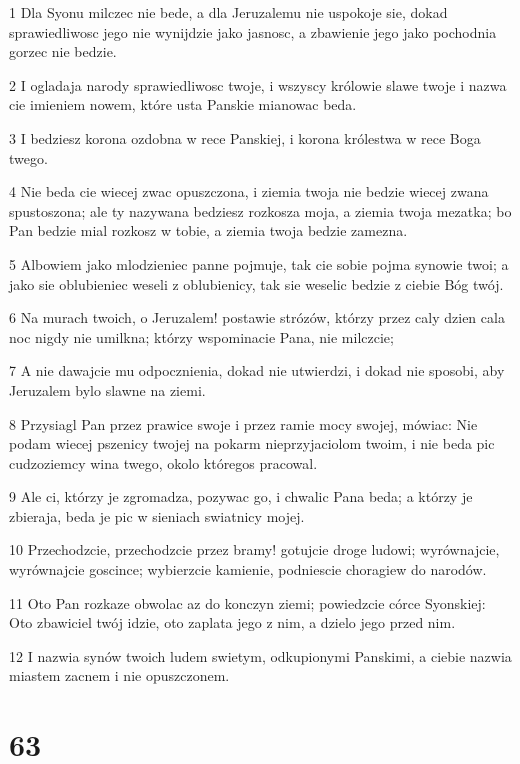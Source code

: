 \par 1 Dla Syonu milczec nie bede, a dla Jeruzalemu nie uspokoje sie, dokad sprawiedliwosc jego nie wynijdzie jako jasnosc, a zbawienie jego jako pochodnia gorzec nie bedzie.
\par 2 I ogladaja narody sprawiedliwosc twoje, i wszyscy królowie slawe twoje i nazwa cie imieniem nowem, które usta Panskie mianowac beda.
\par 3 I bedziesz korona ozdobna w rece Panskiej, i korona królestwa w rece Boga twego.
\par 4 Nie beda cie wiecej zwac opuszczona, i ziemia twoja nie bedzie wiecej zwana spustoszona; ale ty nazywana bedziesz rozkosza moja, a ziemia twoja mezatka; bo Pan bedzie mial rozkosz w tobie, a ziemia twoja bedzie zamezna.
\par 5 Albowiem jako mlodzieniec panne pojmuje, tak cie sobie pojma synowie twoi; a jako sie oblubieniec weseli z oblubienicy, tak sie weselic bedzie z ciebie Bóg twój.
\par 6 Na murach twoich, o Jeruzalem! postawie strózów, którzy przez caly dzien cala noc nigdy nie umilkna; którzy wspominacie Pana, nie milczcie;
\par 7 A nie dawajcie mu odpocznienia, dokad nie utwierdzi, i dokad nie sposobi, aby Jeruzalem bylo slawne na ziemi.
\par 8 Przysiagl Pan przez prawice swoje i przez ramie mocy swojej, mówiac: Nie podam wiecej pszenicy twojej na pokarm nieprzyjaciolom twoim, i nie beda pic cudzoziemcy wina twego, okolo któregos pracowal.
\par 9 Ale ci, którzy je zgromadza, pozywac go, i chwalic Pana beda; a którzy je zbieraja, beda je pic w sieniach swiatnicy mojej.
\par 10 Przechodzcie, przechodzcie przez bramy! gotujcie droge ludowi; wyrównajcie, wyrównajcie goscince; wybierzcie kamienie, podniescie choragiew do narodów.
\par 11 Oto Pan rozkaze obwolac az do konczyn ziemi; powiedzcie córce Syonskiej: Oto zbawiciel twój idzie, oto zaplata jego z nim, a dzielo jego przed nim.
\par 12 I nazwia synów twoich ludem swietym, odkupionymi Panskimi, a ciebie nazwia miastem zacnem i nie opuszczonem.

\chapter{63}

